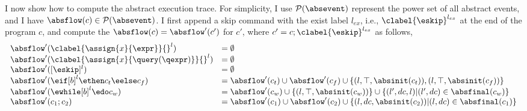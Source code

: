  
   I now show how to compute the abstract execution trace. 
  For simplicity, I use $\mathcal{P}(\absevent)$ represent the power set of all abstract events, and I have $\absflow(c) \in \mathcal{P}(\absevent)$.
  I first append a skip command with 
the exist label $l_{ex}$, i.e., $\clabel{\eskip}^{l_{ex}}$ at the end of the program $c$, 
and compute the $\absflow(c) = \absflow'(c')$ for $c'$, where $c' = c;\clabel{\eskip}^{l_{ex}}$ as follows,
 {\footnotesize
 \[
   \begin{array}{ll}
      \absflow'(\clabel{\assign{x}{\expr}}{}^l)  & = \emptyset  \\
      \absflow'(\clabel{\assign{x}{\query(\qexpr)}}{}^l)  & = \emptyset  \\
      \absflow'([\eskip]^{l})  & = \emptyset \\
      \absflow'(\eif [b]^l \ethen c_t \eelse c_f)  & =  \absflow'(c_t) \cup \absflow'(c_f)
        \cup \{(l, \top,  \absinit(c_t) ) ,  (l, \top, \absinit(c_f)) \} \\
       \absflow'(\ewhile [b]^l \edo c_w)  & =  \absflow'(c_w) \cup \{(l, \top, \absinit(c_w)) \} 
       \cup \{(l', dc, l)| (l', dc) \in \absfinal(c_w) \} \\
       \absflow'(c_1 ; c_2)  & = \absflow'(c_1) \cup  \absflow'(c_2) 
       \cup \{ (l, dc, \absinit(c_2)) | (l, dc) \in \absfinal(c_1) \} \\
   \end{array}
   \]
   }

